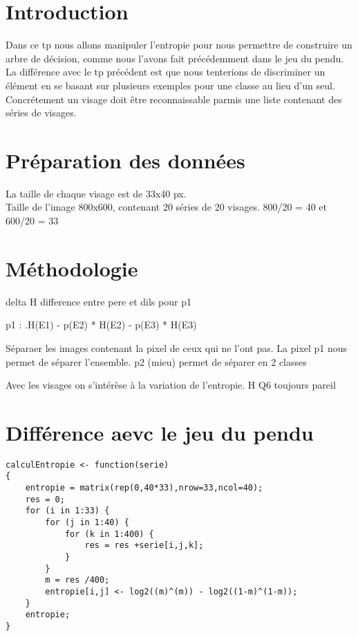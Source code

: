\documentclass[a4paper,12pt]{report}
\begin{document}


\setcounter{page}{1} 
\newpage

\section*{Introduction}

Dans ce tp nous allons manipuler l'entropie pour nous permettre de construire un arbre de décision, comme nous l'avons fait précédemment dans le jeu du pendu. La différence avec le tp précédent est que nous tenterions de discriminer un élément en se basant sur plusieurs exemples pour une classe au lieu d'un seul. Concrétement un visage doit être reconnaissable parmis une liste contenant des séries de visages.


\section*{Préparation des données}

La taille de chaque visage est de 33x40 px.\\
Taille de l'image 800x600, contenant 20 séries de 20 visages.
800/20 = 40 et 
600/20 = 33

\section*{Méthodologie}

delta H difference entre pere et dils pour p1


p1 : .H(E1) - p(E2) * H(E2) - p(E3) * H(E3)

Séparaer les images contenant la pixel de ceux qui ne l'ont pas.  La pixel p1 nous permet de séparer l'ensemble. p2 (mieu) permet de séparer en 2 classes 

Avec les visages on s'intérèse à la variation de l'entropie. H Q6 toujours pareil	

\section*{Différence aevc le jeu du pendu}

\begin{lstlisting}
calculEntropie <- function(serie)
{
	entropie = matrix(rep(0,40*33),nrow=33,ncol=40);
	res = 0;
	for (i in 1:33) {
		for (j in 1:40) {
			for (k in 1:400) {
				res = res +serie[i,j,k];
			}
		}
		m = res /400;
		entropie[i,j] <- log2((m)^(m)) - log2((1-m)^(1-m));
	}
	entropie;
}
\end{lstlisting}
\end{document}
